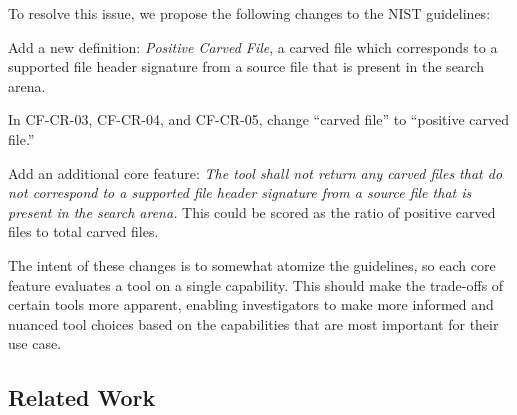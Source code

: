 To resolve this issue, we propose the following changes to the NIST guidelines:
\begin{arabiclist}
 \item Add a new definition: \emph{Positive Carved File}, a carved file which corresponds to a supported file header signature from a source file that is present in the search arena. 
 \item In CF-CR-03, CF-CR-04, and CF-CR-05, change ``carved file'' to ``positive carved file.''
 \item Add an additional core feature: \emph{The tool shall not return any carved files that do not correspond to a supported file header signature from a source file that is present in the search arena.} This could be scored as the ratio of positive carved files to total carved files.
\end{arabiclist}

The intent of these changes is to somewhat atomize the guidelines, so each core feature evaluates a tool on a single capability.
This should make the trade-offs of certain tools more apparent, enabling investigators to make more informed and nuanced tool choices based on the capabilities that are most important for their use case.

\subsection{Related Work}

